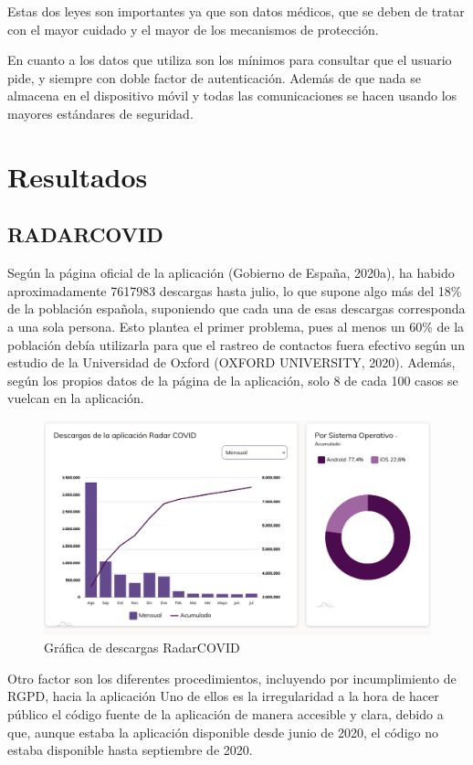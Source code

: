 \documentclass[11pt,a4paper,spanish]{article}
\begin{document}
Estas dos leyes son importantes ya que son datos médicos, que se deben de tratar con el mayor cuidado y el mayor de los mecanismos de protección. 

En cuanto a los datos que utiliza son los mínimos para consultar que el usuario pide, y siempre con doble factor de autenticación. Además de que nada se almacena en el dispositivo móvil y todas las comunicaciones se hacen usando los mayores estándares de seguridad.

\section{Resultados}
\subsection{RADARCOVID}
Según la página oficial de la aplicación (Gobierno de España, 2020a), ha habido aproximadamente 7617983 descargas hasta julio, lo que supone algo más del 18\% de la población española, suponiendo que cada una de esas descargas corresponda a una sola persona. Esto plantea el primer problema, pues al menos un 60\% de la población debía utilizarla para que el rastreo de contactos fuera efectivo según un estudio de la Universidad de Oxford (OXFORD UNIVERSITY, 2020). Además, según los propios datos de la página de la aplicación, solo 8 de cada 100 casos se vuelcan en la aplicación.

\begin{figure}[h!]
  \centering
  \includegraphics[width=0.85\linewidth]{11.png} 
  \caption{Gráfica de descargas RadarCOVID}
\end{figure}
Otro factor son los diferentes procedimientos, incluyendo por incumplimiento de RGPD, hacia la aplicación Uno de ellos es la irregularidad a la hora de hacer público el código fuente de la aplicación de manera accesible y clara, debido a que, aunque estaba la aplicación disponible desde junio de 2020, el código no estaba disponible hasta septiembre de 2020.
\end{document}

